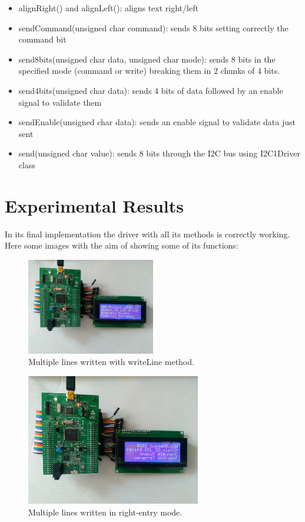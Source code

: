 \documentclass[12pt]{article}
\begin{document}
\begin{itemize}
\item alignRight() and alignLeft(): aligns text right/left

\item sendCommand(unsigned char command): sends 8 bits setting correctly the command bit

\item send8bits(unsigned char data, unsigned char mode): sends 8 bits in the specified mode (command or write) breaking them in 2 chunks of 4 bits.

\item send4bits(unsigned char data): sends 4 bits of data followed by an enable signal to validate them

\item sendEnable(unsigned char data): sends an enable signal to validate data just sent

\item send(unsigned char value): sends 8 bits through the I2C bus using I2C1Driver class

\end{itemize}



\section{Experimental Results}
In its final implementation the driver with all its methods is correctly working. Here some images with the aim of showing some of its functions:

\begin{figure}[H]
\centering
\includegraphics[width=0.5\textwidth, angle=90]{foto_normale.jpg}
\caption{\label{fig:}Multiple lines written with writeLine method.}
\end{figure}

\begin{figure}[H]
\centering
\includegraphics[width=0.68\textwidth]{foto_entry_right.jpg}
\caption{\label{fig:}Multiple lines written in right-entry mode.}
\end{figure}
\end{document}
